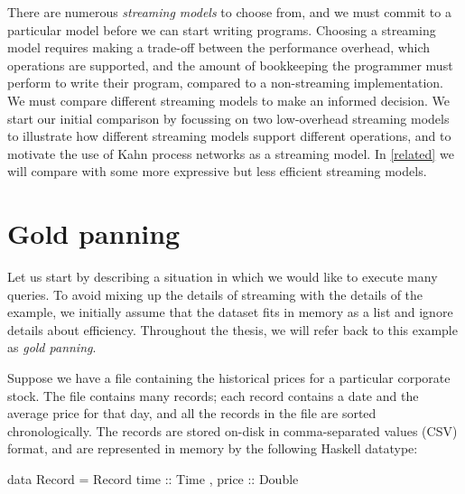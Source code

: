 There are numerous \emph{streaming models} to choose from, and we must commit to a particular model before we can start writing programs.
Choosing a streaming model requires making a trade-off between the performance overhead, which operations are supported, and the amount of bookkeeping the programmer must perform to write their program, compared to a non-streaming implementation.
We must compare different streaming models to make an informed decision.
We start our initial comparison by focussing on two low-overhead streaming models to illustrate how different streaming models support different operations, and to motivate the use of Kahn process networks as a streaming model.
In \cref{related} we will compare with some more expressive but less efficient streaming models.

\section{Gold panning}
\label{taxonomy/gold-panning}
Let us start by describing a situation in which we would like to execute many queries.
To avoid mixing up the details of streaming with the details of the example, we initially assume that the dataset fits in memory as a list and ignore details about efficiency.
Throughout the thesis, we will refer back to this example as \emph{gold panning}.

Suppose we have a file containing the historical prices for a particular corporate stock.
The file contains many records; each record contains a date and the average price for that day, and all the records in the file are sorted chronologically.
The records are stored on-disk in comma-separated values (CSV) format, and are represented in memory by the following Haskell datatype:

\begin{haskell}
data Record = Record
 { time  :: Time
 , price :: Double }
\end{haskell}

